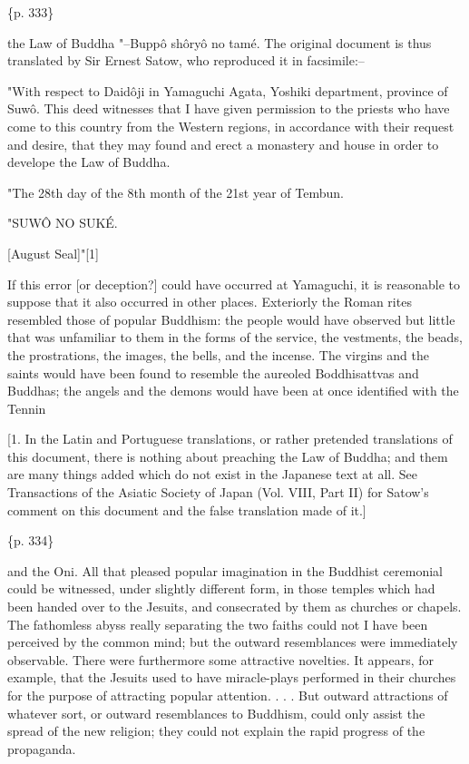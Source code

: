 \{p. 333\}

the Law of Buddha "--Buppô shôryô no tamé. The original document is thus translated by Sir Ernest Satow, who reproduced it in facsimile:--

"With respect to Daidôji in Yamaguchi Agata, Yoshiki department, province of Suwô. This deed witnesses that I have given permission to the priests who have come to this country from the Western regions, in accordance with their request and desire, that they may found and erect a monastery and house in order to develope the Law of Buddha.

"The 28th day of the 8th month of the 21st year of Tembun.

"SUWÔ NO SUKÉ.

[August Seal]"[1]

If this error [or deception?] could have occurred at Yamaguchi, it is reasonable to suppose that it also occurred in other places. Exteriorly the Roman rites resembled those of popular Buddhism: the people would have observed but little that was unfamiliar to them in the forms of the service, the vestments, the beads, the prostrations, the images, the bells, and the incense. The virgins and the saints would have been found to resemble the aureoled Boddhisattvas and Buddhas; the angels and the demons would have been at once identified with the Tennin

[1. In the Latin and Portuguese translations, or rather pretended translations of this document, there is nothing about preaching the Law of Buddha; and them are many things added which do not exist in the Japanese text at all. See Transactions of the Asiatic Society of Japan (Vol. VIII, Part II) for Satow's comment on this document and the false translation made of it.]

\{p. 334\}

and the Oni. All that pleased popular imagination in the Buddhist ceremonial could be witnessed, under slightly different form, in those temples which had been handed over to the Jesuits, and consecrated by them as churches or chapels. The fathomless abyss really separating the two faiths could not I have been perceived by the common mind; but the outward resemblances were immediately observable. There were furthermore some attractive novelties. It appears, for example, that the Jesuits used to have miracle-plays performed in their churches for the purpose of attracting popular attention. . . . But outward attractions of whatever sort, or outward resemblances to Buddhism, could only assist the spread of the new religion; they could not explain the rapid progress of the propaganda.

